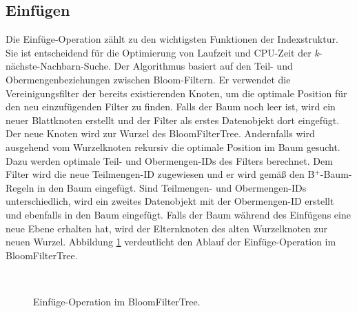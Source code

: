 \subsection{Einfügen}\label{sec:einfügen}
Die Einfüge-Operation zählt zu den wichtigsten Funktionen der Indexstruktur. Sie ist entscheidend für die Optimierung von Laufzeit und CPU-Zeit der \textit{k}-nächste-Nachbarn-Suche. Der Algorithmus basiert auf den Teil- und Obermengenbeziehungen zwischen Bloom-Filtern. Er verwendet die Vereinigungsfilter der bereits existierenden Knoten, um die optimale Position für den neu einzufügenden Filter zu finden. Falls der Baum noch leer ist, wird ein neuer Blattknoten erstellt und der Filter als erstes Datenobjekt dort eingefügt. Der neue Knoten wird zur Wurzel des BloomFilterTree. Andernfalls wird ausgehend vom Wurzelknoten rekursiv die optimale Position im Baum gesucht. Dazu werden optimale Teil- und Obermengen-IDs des Filters berechnet. Dem Filter wird die neue Teilmengen-ID zugewiesen und er wird gemäß den B$^+$-Baum-Regeln in den Baum eingefügt. Sind Teilmengen- und Obermengen-IDs unterschiedlich, wird ein zweites Datenobjekt mit der Obermengen-ID erstellt und ebenfalls in den Baum eingefügt. Falls der Baum während des Einfügens eine neue Ebene erhalten hat, wird der Elternknoten des alten Wurzelknoten zur neuen Wurzel. Abbildung \ref{fig:insert} verdeutlicht den Ablauf der Einfüge-Operation im BloomFilterTree. 
\begin{figure}[hpbt]
  \centering
  \\
  \caption[Einfüge-Operation im BloomFilterTree]{Einfüge-Operation im BloomFilterTree.}\label{fig:insert}
\end{figure}

